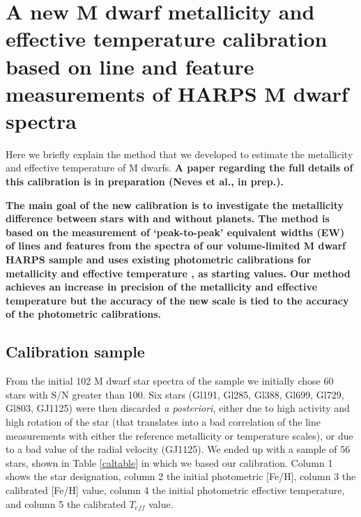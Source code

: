 \documentclass[structabstract]{aa}
\begin{document}



\appendix

\label{appendix}

\section{A new M dwarf metallicity and effective temperature calibration based on line and feature measurements of HARPS M dwarf spectra}

Here we briefly explain the method that we developed to estimate the metallicity and effective temperature of M dwarfs. \textbf{A paper regarding the full details of this calibration is in preparation (Neves et al., in prep.).}

\textbf{The main goal of the new calibration is to investigate the metallicity difference between stars with and without planets. The method is based on the measurement of `peak-to-peak' equivalent widths (EW) of lines and features from the spectra of our volume-limited M dwarf HARPS sample and uses existing photometric calibrations for metallicity \citep{Neves-2012}  and effective temperature \citep{Casagrande-2008}, as starting values. Our method achieves an increase in precision of the metallicity and effective temperature but the accuracy of the new scale is tied to the accuracy of the photometric calibrations.}







\subsection{Calibration sample}

From the initial 102 M dwarf star spectra of the \citet{Bonfils-2011} sample we initially chose 60 stars with S/N greater than 100. Six stars (Gl191, Gl285, Gl388, Gl699, Gl729, Gl803, GJ1125) were then discarded \textit{a posteriori}, either due to high activity and high rotation of the star (that translates into a bad correlation of the line measurements with either the reference metallicity or temperature scales), or due to a bad value of the radial velocity (GJ1125). We ended up with a sample of 56 stars, shown in Table \ref{caltable} in which we based our calibration. Column 1 shows the star designation, column 2 the initial photometric [Fe/H], column 3 the calibrated [Fe/H] value, column 4 the initial photometric effective temperature, and column 5 the calibrated $T_{eff}$ value.
\end{document}
